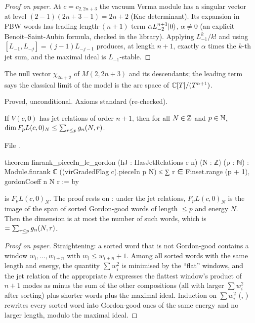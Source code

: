 \begin{proof}[Proof on paper]
At $c=c_{2,2n+3}$ the vacuum Verma module has a singular vector at level $(2-1)(2n+3-1)=2n+2$ (Kac determinant). Its
expansion in PBW words has leading length-$(n+1)$ term $\alpha L_{-2}^{n+1}|0\rangle$, $\alpha\ne0$ (an explicit
Benoit--Saint-Aubin formula, checked in the library). Applying $L_{-1}^k/k!$ and using $[L_{-1},L_{-j}]=(j-1)L_{-j-1}$
produces, at length $n+1$, exactly $\alpha$ times the $k$-th jet sum, and the maximal ideal is $L_{-1}$-stable.
\end{proof}

\begin{physics}
The null vector $\chi_{2n+2}$ of $M(2,2n+3)$ and its descendants; the leading term says the classical limit of the
model is the arc space of ${\mathbb{C}}[T]/(T^{n+1})$.
\end{physics}

\begin{status}
Proved, unconditional. Axioms standard (re-checked).
\end{status}

\begin{theorem}\label{l29:thm:upper}
If $V(c,0)$ has jet relations of order $n+1$, then for all $N\in{\mathbb{Z}}$ and $p\in{\mathbb{N}}$,
$\dim F_pL(c,0)_N\le\sum_{r\le p}g_n(N,r)$.
\end{theorem}

\noindent File .
\begin{leancode}
theorem finrank_pieceIn_le_gordon (hJ : HasJetRelations c n) (N : ℤ) (p : ℕ) :
    Module.finrank ℂ ((virGradedFlag c).pieceIn p N) ≤
      ∑ r ∈ Finset.range (p + 1), gordonCoeff n N r := by
\end{leancode}

\begin{dictionary}
 is $F_pL(c,0)_N$. The proof rests on : under the jet
relations, $F_pL(c,0)_N$ is the image of the span of sorted Gordon-good words of length $\le p$ and energy $N$. Then
the dimension is at most the number of such words, which is  $=\sum_{r\le p}g_n(N,r)$.
\end{dictionary}

\begin{proof}[Proof on paper]
Straightening: a sorted word that is not Gordon-good contains a window $w_i,\dots,w_{i+n}$ with $w_i\le w_{i+n}+1$.
Among all sorted words with the same length and energy, the quantity $\sum w_i^2$ is minimised by the ``flat''
windows, and the jet relation of the appropriate $k$ expresses the flattest window's product of $n+1$ modes as minus
the sum of the other compositions (all with larger $\sum w_i^2$ after sorting) plus shorter words plus the maximal
ideal. Induction on $\sum w_i^2$ (, ) rewrites every sorted word into
Gordon-good ones of the same energy and no larger length, modulo the maximal ideal.
\end{proof}

